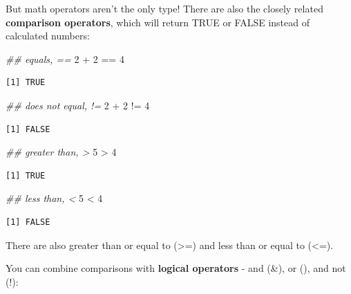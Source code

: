 \documentclass[
  letterpaper,
  DIV=11,
  numbers=noendperiod]{scrreprt}
\newenvironment{Shaded}{\begin{snugshade}}{\end{snugshade}}
\newcommand{\DecValTok}[1]{\textcolor[rgb]{0.68,0.00,0.00}{#1}}
\newcommand{\DocumentationTok}[1]{\textcolor[rgb]{0.37,0.37,0.37}{\textit{#1}}}
\newcommand{\SpecialCharTok}[1]{\textcolor[rgb]{0.37,0.37,0.37}{#1}}
\begin{document}
But math operators aren't the only type! There are also the closely
related \textbf{comparison operators}, which will return TRUE or FALSE
instead of calculated numbers:

\begin{Shaded}
\begin{Highlighting}[]
\DocumentationTok{\#\# equals, ==}
\DecValTok{2} \SpecialCharTok{+} \DecValTok{2} \SpecialCharTok{==} \DecValTok{4}
\end{Highlighting}
\end{Shaded}

\begin{verbatim}
[1] TRUE
\end{verbatim}

\begin{Shaded}
\begin{Highlighting}[]
\DocumentationTok{\#\# does not equal, !=}
\DecValTok{2} \SpecialCharTok{+} \DecValTok{2} \SpecialCharTok{!=} \DecValTok{4}
\end{Highlighting}
\end{Shaded}

\begin{verbatim}
[1] FALSE
\end{verbatim}

\begin{Shaded}
\begin{Highlighting}[]
\DocumentationTok{\#\# greater than, \textgreater{}}
\DecValTok{5} \SpecialCharTok{\textgreater{}} \DecValTok{4}
\end{Highlighting}
\end{Shaded}

\begin{verbatim}
[1] TRUE
\end{verbatim}

\begin{Shaded}
\begin{Highlighting}[]
\DocumentationTok{\#\# less than, \textless{}}
\DecValTok{5} \SpecialCharTok{\textless{}} \DecValTok{4}
\end{Highlighting}
\end{Shaded}

\begin{verbatim}
[1] FALSE
\end{verbatim}

There are also greater than or equal to (\textgreater=) and less than or
equal to (\textless=).

You can combine comparisons with \textbf{logical operators} - and (\&),
or (\textbar), and not (!):
\end{document}

